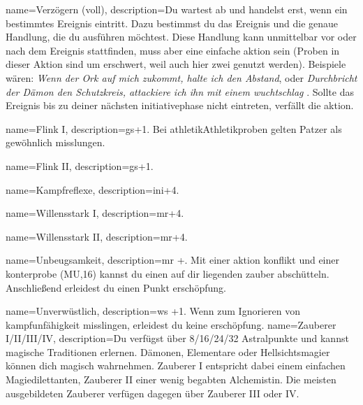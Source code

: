 {
    name={Verzögern (voll)},
    description={Du wartest ab und handelst erst, wenn ein bestimmtes Ereignis eintritt. Dazu bestimmst du das Ereignis und die genaue Handlung, die du ausführen möchtest. Diese Handlung kann unmittelbar vor oder nach dem Ereignis stattfinden, muss aber eine einfache \gls{aktion} sein (Proben in dieser Aktion sind um  erschwert, weil auch hier zwei  genutzt werden). Beispiele wären: \textit{Wenn der Ork auf mich zukommt, halte ich den Abstand}, oder \textit{Durchbricht der Dämon den Schutzkreis, attackiere ich ihn mit einem \gls{wuchtschlag} }. Sollte das Ereignis bis zu deiner nächsten \gls{initiativephase} nicht eintreten, verfällt die \gls{aktion}.}}
        
        
        
        
        

{
    name={Flink I},
    description={\gls{gs}+1. Bei \gls{athletik}{Athletikproben} gelten Patzer als gewöhnlich misslungen.}}

{
    name={Flink II},
    description={\gls{gs}+1.}}

{
    name={Kampfreflexe},
    description={\gls{ini}+4.}}

{
    name={Willensstark I},
    description={\gls{mr}+4.}}

{
    name={Willensstark II},
    description={\gls{mr}+4.}}

{
    name={Unbeugsamkeit},
    description={\gls{mr} +. Mit einer \gls{aktion} \gls{konflikt} und einer \gls{konterprobe} (MU,16) kannst du einen auf dir liegenden \gls{zauber} abschütteln. Anschließend erleidest du einen Punkt \gls{erschöpfung}.}}

{
    name={Unverwüstlich},
    description={\gls{ws} +1. Wenn  zum Ignorieren von \gls{kampfunfähigkeit} misslingen, erleidest du keine \gls{erschöpfung}.}}
{
	name={Zauberer I/II/III/IV},
	description={Du verfügst über 8/16/24/32 Astralpunkte und kannst magische Traditionen erlernen. Dämonen, Elementare oder Hellsichtsmagier können dich magisch wahrnehmen. Zauberer I entspricht dabei einem einfachen Magiedilettanten, Zauberer II einer wenig begabten Alchemistin. Die meisten ausgebildeten Zauberer verfügen dagegen über Zauberer III oder IV.}
}

